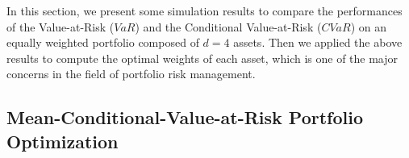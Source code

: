 \documentclass{llncs}
\begin{document}
In this section, we present some simulation results
to compare the performances of
 the Value-at-Risk ($VaR$) and the Conditional Value-at-Risk ($CVaR$) on an equally weighted portfolio composed of $d=4$ assets. Then we applied the above results to compute the optimal weights of each asset, which is one of the major concerns in the field of portfolio risk management.  

\subsection{Mean-Conditional-Value-at-Risk Portfolio Optimization}











\end{document}

